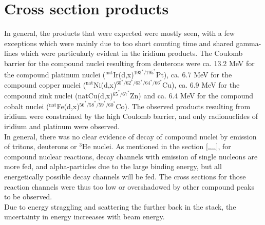 \documentclass[a4paper,11pt,twoside]{book}
\begin{document}
\section{Cross section products}

In general, the products that were expected were mostly seen, with a few exceptions which were mainly due to too short counting time and shared gamma-lines which were particularly evident in the iridium products. The Coulomb barrier for the compound nuclei resulting from deuterons were ca. 13.2 MeV for the compound platinum nuclei ($^\text{nat}$Ir(d,x)$^{193^*/195^*}$Pt), ca. 6.7 MeV for the compound copper nuclei ($^\text{nat}$Ni(d,x)$^{60^*/62^*/63^*/64^*/66^*}$Cu), ca. 6.9 MeV for the compound zink nuclei ($\text{nat}$Cu(d,x)$^{65^*/67^*}$Zn) and ca. 6.4 MeV for the compound cobalt nuclei ($^\text{nat}$Fe(d,x)$^{56^*/58^*/59^*/60^*}$Co). The observed products resulting from iridium were constrained by the high Coulomb barrier, and only radionuclides of iridium and platinum were observed. \\

In general, there was no clear evidence of decay of compound nuclei by emission of tritons, deuterons or $^{3}$He nuclei. As mentioned in the section \ref{....}, for compound nuclear reactions, decay channels with emission of single nucleons are more fed, and alpha-particles due to the large binding energy, but all energetically possible decay channels will be fed. The cross sections for those reaction channels were thus too low or overshadowed by other compound peaks to be observed. \\

Due to energy straggling and scattering the further back in the stack, the uncertainty in energy increeases with beam energy. 




\end{document}
